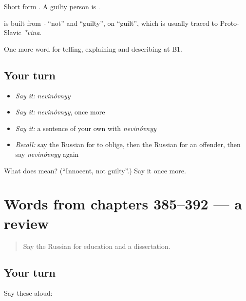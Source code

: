 Short form \emph{}. A guilty person is \emph{}.

\begin{cousinweb}
\textbf{} is built from \emph{-} \textquotedblleft{}not\textquotedblright{} and \emph{} \textquotedblleft{}guilty\textquotedblright{}, on \emph{} \textquotedblleft{}guilt\textquotedblright{}, which is usually traced to Proto-Slavic \emph{*vina}.
\end{cousinweb}

\begin{grammarlens}[title={What you've built}]
One more word for telling, explaining and describing at B1.
\end{grammarlens}

\subsection*{Your turn}
\begin{itemize}
\raggedright
  \item \emph{Say it:} \emph{nevinóvnyy}
  \item \emph{Say it:} \emph{nevinóvnyy}, once more
  \item \emph{Say it:} a sentence of your own with \emph{nevinóvnyy}
  \item \emph{Recall:} say the Russian for to oblige, then the Russian for an offender, then say \emph{nevinóvnyy} again
\end{itemize}

\begin{tcolorbox}[breakable,colback=teal!4,colframe=teal!35!black,title={Before you move on}]
What does  mean? (\textquotedblleft{}Innocent, not guilty\textquotedblright{}.) Say it once more.
\end{tcolorbox}
\section[(dialogue)]{Words from chapters 385–392 — a review}

\label{lesson:RU-R392-review-385-392}



\begin{quote}
Say the Russian for education and a dissertation.
\end{quote}

\subsection*{Your turn}
Say these aloud:

